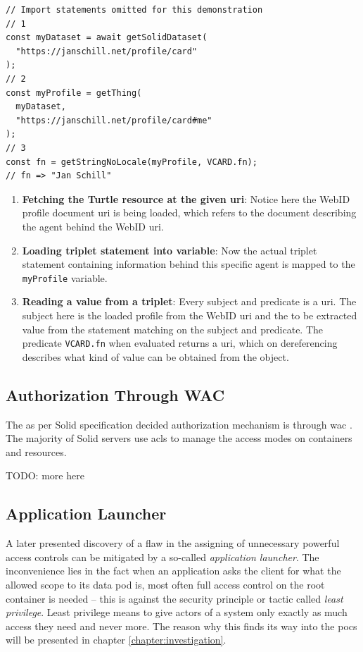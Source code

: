 \begin{lstlisting}[language=Other,columns=fullflexible, caption={Basic usage of Inrupt's solid-client library.}, label={lst:2}]
// Import statements omitted for this demonstration
// 1
const myDataset = await getSolidDataset(
  "https://janschill.net/profile/card"
);
// 2
const myProfile = getThing(
  myDataset,
  "https://janschill.net/profile/card#me"
);
// 3
const fn = getStringNoLocale(myProfile, VCARD.fn);
// fn => "Jan Schill"
\end{lstlisting}

\begin{enumerate}
    \item \textbf{Fetching the Turtle resource at the given \gls{uri}}: Notice here the WebID profile document \gls{uri} is being loaded, which refers to the document describing the agent behind the WebID \gls{uri}.
    \item \textbf{Loading triplet statement into variable}: Now the actual triplet statement containing information behind this specific agent is mapped to the \texttt{myProfile} variable.
    \item \textbf{Reading a value from a triplet}: Every subject and predicate is a \gls{uri}. The subject here is the loaded profile from the WebID \gls{uri} and the to be extracted value from the statement matching on the subject and predicate. The predicate \texttt{VCARD.fn} when evaluated returns a \gls{uri}, which on dereferencing describes what kind of value can be obtained from the object.
\end{enumerate}

\subsection{Authorization Through WAC}

The as per Solid specification decided authorization mechanism is through \gls{wac} \cite{wac}. The majority of Solid servers use \glspl{acl} to manage the access modes on containers and resources.

TODO: more here

\subsection{Application Launcher}

A later presented discovery of a flaw in the assigning of unnecessary powerful access controls can be mitigated by a so-called \textit{application launcher}. The inconvenience lies in the fact when an application asks the client for what the allowed scope to its data pod is, most often full access control on the root container is needed -- this is against the security principle or tactic called \textit{least privilege}. Least privilege means to give actors of a system only exactly as much access they need and never more. The reason why this finds its way into the \glspl{poc} will be presented in chapter \ref{chapter:investigation}.

